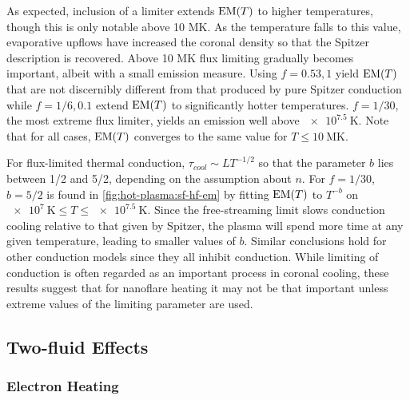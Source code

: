 As expected, inclusion of a limiter extends $\emd[T]$ to higher temperatures, though this is only notable above 10 MK. As the temperature falls to this value, evaporative upflows have increased the coronal density so that the Spitzer description is recovered. Above 10 MK flux limiting gradually becomes important, albeit with a small emission measure. Using $f=0.53,1$ yield $\emd[T]$ that are not discernibly different from that produced by pure Spitzer conduction while $f=1/6,0.1$ extend $\emd[T]$ to significantly hotter temperatures. $f=1/30$, the most extreme flux limiter, yields an emission well above $\SI{e7.5}{\kelvin}$. Note that for all cases, $\emd[T]$ converges to the same value for $T\le\SI{10}{\mega\kelvin}$.

For flux-limited thermal conduction, $\tau_{cool} \sim LT^{-1/2}$ so that the parameter $b$ lies between 1/2 and 5/2, depending on the assumption about $n$. For $f = 1/30$, $b = 5/2$ is found in \autoref{fig:hot-plasma:sf-hf-em} by fitting $\emd[T]$ to $T^{-b}$ on $\SI{e7}{\kelvin} \le T \le \SI{e7.5}{\kelvin}$. Since the free-streaming limit slows conduction cooling relative to that given by Spitzer, the plasma will spend more time at any given temperature, leading to smaller values of $b$. Similar conclusions hold for other conduction models \citep[e.g. the non-local model discussed in the coronal context by][]{karpen_nonlocal_1987,west_lifetime_2008} since they all inhibit conduction. While limiting of conduction is often regarded as an important process in coronal cooling, these results suggest that for nanoflare heating it may not be that important unless extreme values of the limiting parameter are used.

\subsection{Two-fluid Effects}\label{hot-plasma:subsec:two-fluid-res}

\subsubsection{Electron Heating}\label{hot-plasma:subsubsec:electron-heating}

